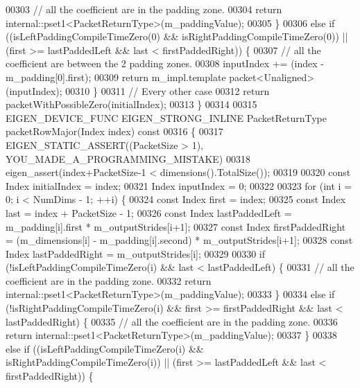 \begin{DoxyCode}
00303       \textcolor{comment}{// all the coefficient are in the padding zone.}
00304       \textcolor{keywordflow}{return} internal::pset1<PacketReturnType>(m\_paddingValue);
00305     \}
00306     \textcolor{keywordflow}{else} \textcolor{keywordflow}{if} ((isLeftPaddingCompileTimeZero(0) && isRightPaddingCompileTimeZero(0)) || (first >= 
      lastPaddedLeft && last < firstPaddedRight)) \{
00307       \textcolor{comment}{// all the coefficient are between the 2 padding zones.}
00308       inputIndex += (index - m\_padding[0].first);
00309       \textcolor{keywordflow}{return} m\_impl.template packet<Unaligned>(inputIndex);
00310     \}
00311     \textcolor{comment}{// Every other case}
00312     \textcolor{keywordflow}{return} packetWithPossibleZero(initialIndex);
00313   \}
00314 
00315   EIGEN\_DEVICE\_FUNC EIGEN\_STRONG\_INLINE PacketReturnType packetRowMajor(Index index)\textcolor{keyword}{ const}
00316 \textcolor{keyword}{  }\{
00317     EIGEN\_STATIC\_ASSERT((PacketSize > 1), YOU\_MADE\_A\_PROGRAMMING\_MISTAKE)
00318     eigen\_assert(index+PacketSize-1 < dimensions().TotalSize());
00319 
00320     \textcolor{keyword}{const} Index initialIndex = index;
00321     Index inputIndex = 0;
00322 
00323     \textcolor{keywordflow}{for} (\textcolor{keywordtype}{int} i = 0; i < NumDims - 1; ++i) \{
00324       \textcolor{keyword}{const} Index first = index;
00325       \textcolor{keyword}{const} Index last = index + PacketSize - 1;
00326       \textcolor{keyword}{const} Index lastPaddedLeft = m\_padding[i].first * m\_outputStrides[i+1];
00327       \textcolor{keyword}{const} Index firstPaddedRight = (m\_dimensions[i] - m\_padding[i].second) * m\_outputStrides[i+1];
00328       \textcolor{keyword}{const} Index lastPaddedRight = m\_outputStrides[i];
00329 
00330       \textcolor{keywordflow}{if} (!isLeftPaddingCompileTimeZero(i) && last < lastPaddedLeft) \{
00331         \textcolor{comment}{// all the coefficient are in the padding zone.}
00332         \textcolor{keywordflow}{return} internal::pset1<PacketReturnType>(m\_paddingValue);
00333       \}
00334       \textcolor{keywordflow}{else} \textcolor{keywordflow}{if} (!isRightPaddingCompileTimeZero(i) && first >= firstPaddedRight && last < lastPaddedRight) \{
00335         \textcolor{comment}{// all the coefficient are in the padding zone.}
00336         \textcolor{keywordflow}{return} internal::pset1<PacketReturnType>(m\_paddingValue);
00337       \}
00338       \textcolor{keywordflow}{else} \textcolor{keywordflow}{if} ((isLeftPaddingCompileTimeZero(i) && isRightPaddingCompileTimeZero(i)) || (first >= 
      lastPaddedLeft && last < firstPaddedRight)) \{

\end{DoxyCode}
